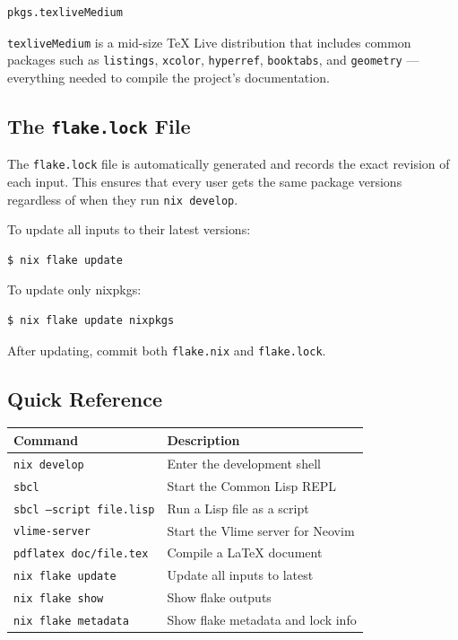 \documentclass[a4paper,11pt]{article}
\newcommand{\key}[1]{\texttt{#1}}
\newcommand{\file}[1]{\texttt{#1}}
\newcommand{\pkg}[1]{\texttt{#1}}
\begin{document}
\begin{lstlisting}[style=nix]
pkgs.texliveMedium
\end{lstlisting}

\pkg{texliveMedium} is a mid-size TeX Live distribution that includes
common packages such as \pkg{listings}, \pkg{xcolor}, \pkg{hyperref},
\pkg{booktabs}, and \pkg{geometry} --- everything needed to compile
the project's documentation.

\subsection{The \file{flake.lock} File}

The \file{flake.lock} file is automatically generated and records the exact
revision of each input. This ensures that every user gets the same package
versions regardless of when they run \key{nix develop}.

To update all inputs to their latest versions:

\begin{lstlisting}[style=shell]
$ nix flake update
\end{lstlisting}

To update only nixpkgs:

\begin{lstlisting}[style=shell]
$ nix flake update nixpkgs
\end{lstlisting}

After updating, commit both \file{flake.nix} and \file{flake.lock}.

\subsection{Quick Reference}

\begin{center}
\begin{tabular}{lp{8cm}}
  \toprule
  \textbf{Command} & \textbf{Description} \\
  \midrule
  \texttt{nix develop}            & Enter the development shell \\
  \texttt{sbcl}                   & Start the Common Lisp REPL \\
  \texttt{sbcl --script file.lisp}& Run a Lisp file as a script \\
  \texttt{vlime-server}           & Start the Vlime server for Neovim \\
  \texttt{pdflatex doc/file.tex}  & Compile a \LaTeX{} document \\
  \texttt{nix flake update}       & Update all inputs to latest \\
  \texttt{nix flake show}         & Show flake outputs \\
  \texttt{nix flake metadata}     & Show flake metadata and lock info \\
  \bottomrule
\end{tabular}
\end{center}
\end{document}
